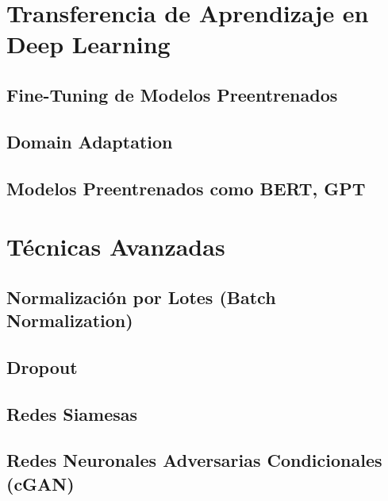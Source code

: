 \documentclass[12pt]{article}
\begin{document}
\section{Transferencia de Aprendizaje en Deep Learning}

\subsection{Fine-Tuning de Modelos Preentrenados}
\newpage
\subsection{Domain Adaptation}
\newpage
\subsection{Modelos Preentrenados como BERT, GPT}
\newpage
\section{Técnicas Avanzadas}


\subsection{Normalización por Lotes (Batch Normalization)}
\newpage
\subsection{Dropout}
\newpage
\subsection{Redes Siamesas}
\newpage
\subsection{Redes Neuronales Adversarias Condicionales (cGAN)}
\newpage
\end{document}
